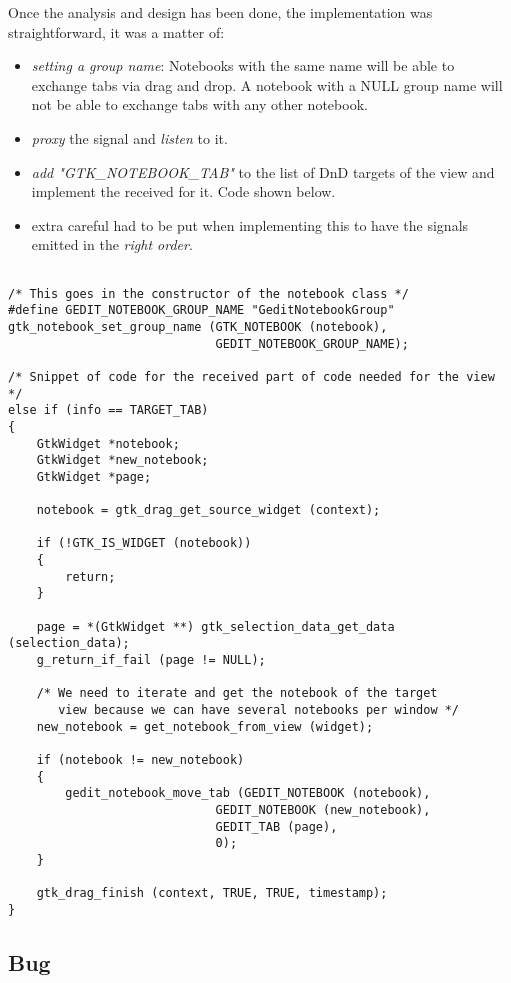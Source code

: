 Once the analysis and design has been done, the implementation was straightforward, it was a matter of:
\begin{itemize}
  \item \emph{setting a group name}: Notebooks with the same name will be able to exchange tabs via drag and drop. A notebook with a NULL group name will not be able to exchange tabs with any other notebook.
  \item \emph{proxy} the signal and \emph{listen} to it.
  \item \emph{add "GTK\_NOTEBOOK\_TAB"} to the list of DnD targets of the view and implement the received for it. Code shown below.
  \item extra careful had to be put when implementing this to have the signals emitted in the \emph{right order}.
\end{itemize}

\begin{lstlisting}[style=GObject]

/* This goes in the constructor of the notebook class */
#define GEDIT_NOTEBOOK_GROUP_NAME "GeditNotebookGroup"
gtk_notebook_set_group_name (GTK_NOTEBOOK (notebook),
                             GEDIT_NOTEBOOK_GROUP_NAME);

/* Snippet of code for the received part of code needed for the view */
else if (info == TARGET_TAB)
{
	GtkWidget *notebook;
	GtkWidget *new_notebook;
	GtkWidget *page;

	notebook = gtk_drag_get_source_widget (context);

	if (!GTK_IS_WIDGET (notebook))
	{
		return;
	}

	page = *(GtkWidget **) gtk_selection_data_get_data (selection_data);
	g_return_if_fail (page != NULL);

	/* We need to iterate and get the notebook of the target
	   view because we can have several notebooks per window */
	new_notebook = get_notebook_from_view (widget);

	if (notebook != new_notebook)
	{
		gedit_notebook_move_tab (GEDIT_NOTEBOOK (notebook),
			                 GEDIT_NOTEBOOK (new_notebook),
			                 GEDIT_TAB (page),
			                 0);
	}

	gtk_drag_finish (context, TRUE, TRUE, timestamp);
}

\end{lstlisting}

\subsection{Bug}

